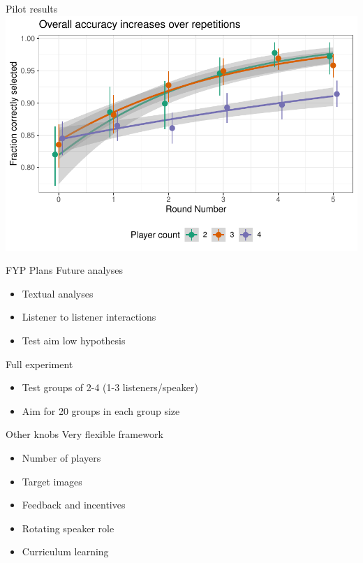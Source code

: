 \documentclass[12pt, xcolor=beamer,table,usenames,dvipsnames, ignorenonframetext, ngerman,t]{beamer}
\begin{document}
\begin{frame}{Pilot results}
	\includegraphics[width=\textwidth]{images/accuracy.pdf}
	
\end{frame}

\begin{frame}{FYP Plans}
	Future analyses
	\begin{itemize}
		\item Textual analyses
		\item Listener to listener interactions
		\item Test aim low hypothesis
	\end{itemize}

Full experiment
\begin{itemize}
	\item Test groups of 2-4 (1-3 listeners/speaker)
	\item Aim for 20 groups in each group size
\end{itemize}
\end{frame}

\begin{frame}{Other knobs}
	Very flexible framework
\begin{itemize}
	\item Number of players
	\item Target images
	\item Feedback and incentives 
	\item Rotating speaker role 
	\item Curriculum learning
\end{itemize}
\end{frame}
\end{document}
